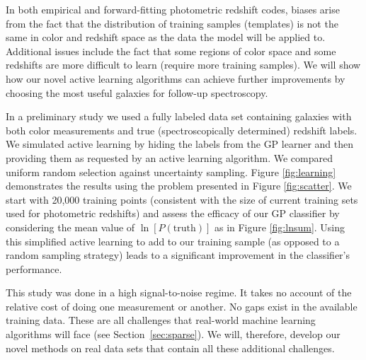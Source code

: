 \documentclass[prd,nofootbib,floatfix,11pt,tightenlines,nofootinbib]{revtex4}
\begin{document}
In both empirical and forward-fitting photometric redshift codes, biases
arise from the fact that the distribution of training samples (templates)
is not the same in color and redshift space as the data the model will be
applied to.  Additional issues include the fact that some regions of color
space and some redshifts are more difficult to learn (require more training
samples).  We will show how our novel active learning algorithms can
achieve further improvements by choosing the most useful galaxies for
follow-up spectroscopy.

In a preliminary study we used a fully labeled data set containing galaxies
with both color measurements and true (spectroscopically determined)
redshift labels.  We simulated active learning by hiding the labels from
the GP learner and then providing them as requested by an active learning
algorithm.  We compared uniform random selection against uncertainty
sampling.  Figure \ref{fig:learning} demonstrates the results using the
problem presented in Figure \ref{fig:scatter}. %
We start with 20,000 training points (consistent with the size of
current training sets used for photometric redshifts) and assess the efficacy of our
GP classifier by considering the mean value of $\ln[P(\text{truth})]$ as in
Figure \ref{fig:lnsum}.  Using this simplified active learning to add
to our training sample (as opposed to a random sampling strategy) 
leads to a significant improvement in the classifier's performance.

This study was done in a high signal-to-noise regime.  It takes no account
of the relative cost of doing one measurement or another.  No gaps exist in
the available training data.  These are all challenges that real-world
machine learning algorithms will face (see Section~\ref{sec:sparse}).
We will, therefore, develop our novel
methods on real data sets that contain all these additional challenges.
\end{document}
